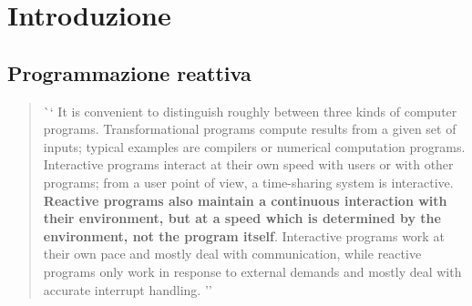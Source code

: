     \begin{frame}[c]
        \titlepage
    \end{frame}

    \section{Introduzione}\label{sec:intro}
        \subsection{Programmazione reattiva}\label{subsec:react}
        \begin{frame}{\insertsectionhead}
            \begin{block}{\insertsubsectionhead}
                \smallskip
                \begin{quote}
                    \foreignlanguage{english}
                    `` It is convenient to distinguish roughly between three kinds of computer programs.
                    Transformational programs compute results from a given set of inputs;
                    typical examples are compilers or numerical computation programs.
                    Interactive programs interact at their own speed with users or with other programs;
                    from a user point of view, a time-sharing system is interactive.
                    \textbf{Reactive programs also maintain a continuous interaction with their environment, but at a speed which is determined by the environment, not the program itself}.
                    Interactive programs work at their own pace and mostly deal with communication, while reactive programs only work in response to external demands and mostly deal with accurate interrupt handling. ''
                \end{quote}
            \end{block}
        \end{frame}

